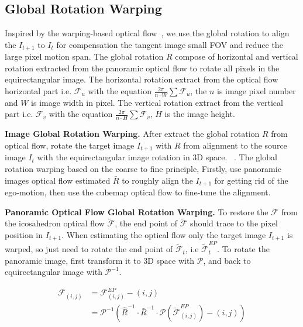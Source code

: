 \subsection{Global Rotation Warping}
\label{sec:approach:warping}

Inspired by the warping-based optical flow~\cite{BroxBPW2004}, we use the global rotation to align the $I_{t+1}$ to $I_{t}$ for compensation the tangent image small FOV and reduce the large pixel motion span.
The global rotation $R$ compose of horizontal and vertical rotation extracted from the panoramic optical flow to rotate all pixels in the equirectangular image.
The horizontal rotation extract from the optical flow horizontal part i.e. $\mathcal{F}_u$ with the equation $\frac{2\pi}{n\cdot W}\sum\mathcal{F}_u$, the $n$ is image pixel number and $W$ is image width in pixel.
The vertical rotation extract from the vertical part i.e. $\mathcal{F}_v$ with the equation $\frac{2\pi}{n\cdot H}\sum\mathcal{F}_v$, $H$ is the image height.

\textbf{Image Global Rotation Warping.}
After extract the global rotation $R$ from optical flow, rotate the target image $I_{t+1}$ with $R$ from alignment to the source image $I_{t}$ with the equirectangular image rotation in 3D space. ~\cite{ZioulKZAD2019}.
%
The global rotation warping based on the coarse to fine principle, 
Firstly, use panoramic images optical flow estimated $\bar{R}$ to roughly align the $I_{t+1}$ for getting rid of the ego-motion, then use the cubemap optical flow to fine-tune the alignment.

\textbf{Panoramic Optical Flow Global Rotation Warping.}
To restore the $\mathcal{F}$ from the icosahedron optical flow $\tilde{\mathcal{F}}$, the end point of $\tilde{\mathcal{F}}$ should trace to the pixel position in $I_{t+1}$.
% 
When estimating the optical flow only the target image $I_{t+1}$ is warped, so just need to rotate the end point of $\tilde{\mathcal{F}}_t$, i.e $\tilde{\mathcal{F}}^{EP}_t$. 
%
To rotate the panoramic image, first transform it to 3D space with $\mathcal{P}$, and back to equirectangular image with $\mathcal{P}^{-1}$.

\begin{equation}\label{equ:approach:globalwarp}
\begin{split}
	\mathcal{F}_{(i,j)} &= \mathcal{F}^{EP}_{(i,j)} - (i,j)  \\
				&= \mathcal{P}^{-1} \left( \hat{R}^{-1} \cdot \bar{R}^{-1} \cdot \mathcal{P}(\tilde{\mathcal{F}}^{EP}_{(i,j)}) - (i,j)\right)
\end{split}
\end{equation}
